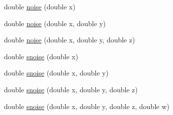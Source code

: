 \begin{DoxyCompactItemize}
double \hyperlink{namespacecprocessing_a4289b302ccbd6bee448b7756854c7baf}{noise} (double x)
\item 
double \hyperlink{namespacecprocessing_a94c3501dd1ee3555f5af3884b11b8a04}{noise} (double x, double y)
\item 
double \hyperlink{namespacecprocessing_a12c5c480ee409902975902ee93e7f6f1}{noise} (double x, double y, double z)
\item 
double \hyperlink{namespacecprocessing_a4e17576d2a90714ee8674267ec110818}{snoise} (double x)
\item 
double \hyperlink{namespacecprocessing_a3e3ddf4e0b20ef72ba96024ba642ae82}{snoise} (double x, double y)
\item 
double \hyperlink{namespacecprocessing_a6e08520154ed9955742b56be9d67d2f8}{snoise} (double x, double y, double z)
\item 
double \hyperlink{namespacecprocessing_a1eff9b8a49a4447c4b7b9c8fe8b70cb0}{snoise} (double x, double y, double z, double w)
\end{DoxyCompactItemize}
